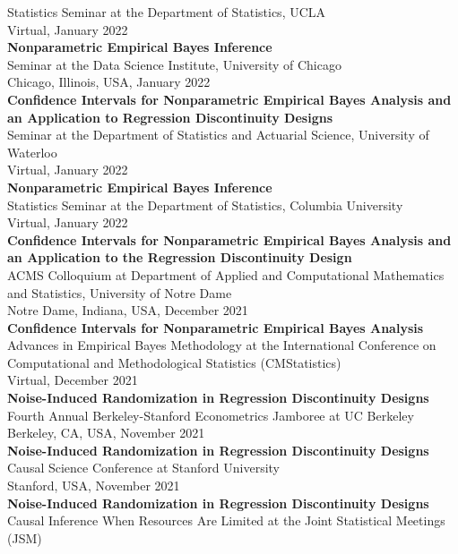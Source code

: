 \documentclass[margin,line]{res}
\begin{document}
\begin{resume}
\begin{adjustwidth*}{0pt}{0pt}
Statistics Seminar at the Department of Statistics, UCLA \\
Virtual, January 2022
 \\
\textbf{Nonparametric Empirical Bayes Inference} \\
Seminar at the Data Science Institute, University of Chicago \\
Chicago, Illinois, USA, January 2022
 \\
\textbf{Confidence Intervals for Nonparametric Empirical Bayes Analysis and an Application to Regression Discontinuity Designs} \\
Seminar at the Department of Statistics and Actuarial Science, University of Waterloo \\
Virtual, January 2022
 \\
\textbf{Nonparametric Empirical Bayes Inference} \\
Statistics Seminar at the Department of Statistics, Columbia University \\
Virtual, January 2022
 \\
\textbf{Confidence Intervals for Nonparametric Empirical Bayes Analysis and an Application to the Regression Discontinuity Design} \\
ACMS Colloquium at Department of Applied and Computational Mathematics and Statistics,  University of Notre Dame \\
Notre Dame, Indiana, USA, December 2021
 \\
\textbf{Confidence Intervals for Nonparametric Empirical Bayes Analysis} \\
Advances in Empirical Bayes Methodology at the International Conference on Computational and Methodological Statistics (CMStatistics) \\
Virtual, December 2021
 \\
\textbf{Noise-Induced Randomization in Regression Discontinuity Designs} \\
Fourth Annual Berkeley-Stanford Econometrics Jamboree at UC Berkeley \\
Berkeley, CA, USA, November 2021
 \\
\textbf{Noise-Induced Randomization in Regression Discontinuity Designs} \\
Causal Science Conference at Stanford University \\
Stanford, USA, November 2021
 \\
\textbf{Noise-Induced Randomization in Regression Discontinuity Designs} \\
Causal Inference When Resources Are Limited at the Joint Statistical Meetings (JSM) \\

\end{adjustwidth*}
\end{resume}
\end{document}

